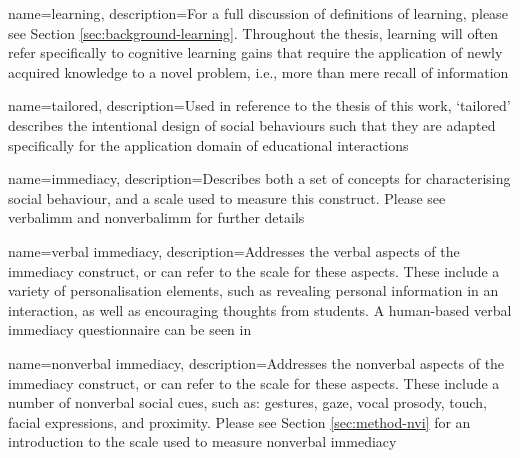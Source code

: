 \usepackage[acronym,toc]{glossaries}

\makeglossaries
 
{
name={learning},
description={For a full discussion of definitions of learning, please see Section \ref{sec:background-learning}. Throughout the thesis, learning will often refer specifically to cognitive learning gains that require the application of newly acquired knowledge to a novel problem, i.e., more than mere recall of information}
}

{
name={tailored},
description={Used in reference to the thesis of this work, `tailored' describes the intentional design of social behaviours such that they are adapted specifically for the application domain of educational interactions}
}

{
name={immediacy},
description={Describes both a set of concepts for characterising social behaviour, and a scale used to measure this construct. Please see \gls{verbalimm} and \gls{nonverbalimm} for further details}
}

{
name={verbal immediacy},
description={Addresses the verbal aspects of the immediacy construct, or can refer to the scale for these aspects. These include a variety of personalisation elements, such as revealing personal information in an interaction, as well as encouraging thoughts from students. A human-based verbal immediacy questionnaire can be seen in \citet{gorham1988relationship}}
}

{
name={nonverbal immediacy},
description={Addresses the nonverbal aspects of the immediacy construct, or can refer to the scale for these aspects. These include a number of nonverbal social cues, such as: gestures, gaze, vocal prosody, touch, facial expressions, and proximity. Please see Section \ref{sec:method-nvi} for an introduction to the scale used to measure nonverbal immediacy}
}
 






